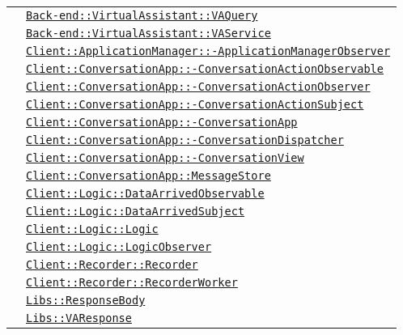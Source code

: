 \begin{longtable}{|>{\centering}m{3cm}|m{10cm}<{\centering}|}
& \hyperref[Back-end::VirtualAssistant::VAQuery]{\texttt{Back-end::VirtualAssistant::VAQuery}}\\
& \hyperref[Back-end::VirtualAssistant::VAService]{\texttt{Back-end::VirtualAssistant::VAService}}\\
& \hyperref[Client::ApplicationManager::ApplicationManagerObserver]{\texttt{Client::ApplicationManager::-\linebreak ApplicationManagerObserver}}\\
& \hyperref[Client::ConversationApp::ConversationActionObservable]{\texttt{Client::ConversationApp::-\linebreak ConversationActionObservable}}\\
& \hyperref[Client::ConversationApp::ConversationActionObserver]{\texttt{Client::ConversationApp::-\linebreak ConversationActionObserver}}\\
& \hyperref[Client::ConversationApp::ConversationActionSubject]{\texttt{Client::ConversationApp::-\linebreak ConversationActionSubject}}\\
& \hyperref[Client::ConversationApp::ConversationApp]{\texttt{Client::ConversationApp::-\linebreak ConversationApp}}\\
& \hyperref[Client::ConversationApp::ConversationDispatcher]{\texttt{Client::ConversationApp::-\linebreak ConversationDispatcher}}\\
& \hyperref[Client::ConversationApp::ConversationView]{\texttt{Client::ConversationApp::-\linebreak ConversationView}}\\
& \hyperref[Client::ConversationApp::MessageStore]{\texttt{Client::ConversationApp::MessageStore}}\\
& \hyperref[Client::Logic::DataArrivedObservable]{\texttt{Client::Logic::DataArrivedObservable}}\\
& \hyperref[Client::Logic::DataArrivedSubject]{\texttt{Client::Logic::DataArrivedSubject}}\\
& \hyperref[Client::Logic::Logic]{\texttt{Client::Logic::Logic}}\\
& \hyperref[Client::Logic::LogicObserver]{\texttt{Client::Logic::LogicObserver}}\\
& \hyperref[Client::Recorder::Recorder]{\texttt{Client::Recorder::Recorder}}\\
& \hyperref[Client::Recorder::RecorderWorker]{\texttt{Client::Recorder::RecorderWorker}}\\
& \hyperref[Libs::ResponseBody]{\texttt{Libs::ResponseBody}}\\
& \hyperref[Libs::VAResponse]{\texttt{Libs::VAResponse}}\\ \hline


\end{longtable}
